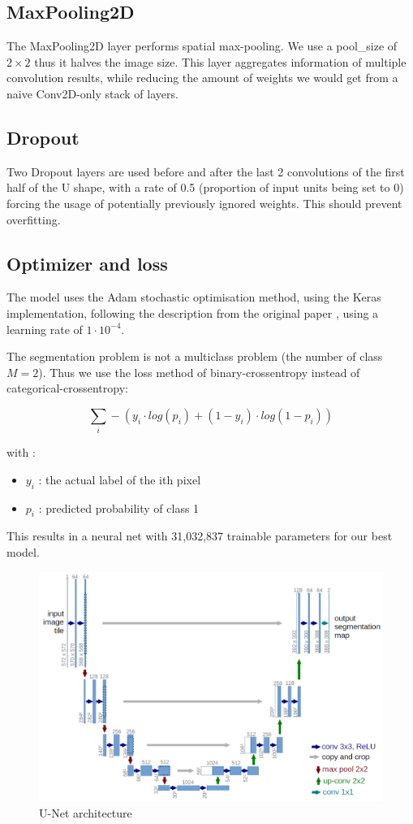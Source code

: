 \documentclass[10pt,conference,compsocconf]{IEEEtran}
\begin{document}
\subsection{MaxPooling2D}
The MaxPooling2D layer performs spatial max-pooling. We use a pool\_size of $2\times2$ thus it halves the image size. This layer aggregates information of multiple convolution results, while reducing the amount of weights we would get from a naive Conv2D-only stack of layers.

\subsection{Dropout}
Two Dropout layers are used before and after the last 2 convolutions of the first half of the U shape, with a rate of 0.5 (proportion of input units being set to 0) forcing the usage of potentially previously ignored weights. This should prevent overfitting. 

\subsection{Optimizer and loss}
The model uses the Adam stochastic optimisation method, using the Keras implementation, following the description from the original paper \cite{Ruder2016AnOO}, using a learning rate of $1\cdot10^{-4}$. 

The segmentation problem is not a multiclass problem (the number of class $M = 2$). Thus we use the loss method of binary-crossentropy instead of categorical-crossentropy:

$$\sum_{i}-(y_i \cdot log(p_i) + (1 - y_i) \cdot log(1 - p_i))$$

with : 
\begin{itemize}
    \item $y_i$ : the actual label of the ith pixel
    \item $p_i$ : predicted probability of class 1
\end{itemize}

This results in a neural net with 31,032,837 trainable parameters for our best model.

\begin{figure}
    \centering
    \includegraphics[scale=0.15]{u-net.png}
    \caption{U-Net architecture}
    \label{fig:Unet}
\end{figure}
\end{document}
